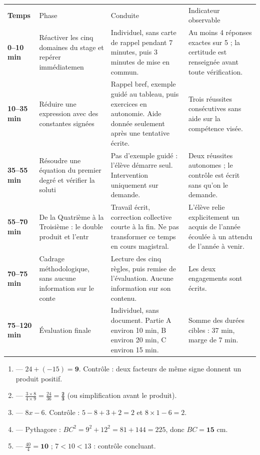 \documentclass[10pt,a4paper]{article}
\begin{document}
\par\noindent\begin{tabularx}{\linewidth}{>{\bfseries}p{18mm} p{34mm} X X}
\rowcolor{Navy}\color{white}Temps & \color{white}Phase & \color{white}Conduite & \color{white}Indicateur observable \\
0--10 min & Réactiver les cinq domaines du stage et repérer immédiatemen & Individuel, sans carte de rappel pendant 7 minutes, puis 3 minutes de mise en commun. & Au moins 4 réponses exactes sur 5 ; la certitude est renseignée avant toute vérification. \\
10--35 min & Réduire une expression avec des constantes signées & Rappel bref, exemple guidé au tableau, puis exercices en autonomie. Aide donnée seulement après une tentative écrite. & Trois réussites consécutives sans aide sur la compétence visée. \\
35--55 min & Résoudre une équation du premier degré et vérifier la soluti & Pas d'exemple guidé : l'élève démarre seul. Intervention uniquement sur demande. & Deux réussites autonomes ; le contrôle est écrit sans qu'on le demande. \\
55--70 min & De la Quatrième à la Troisième : le double produit et l'entr & Travail écrit, correction collective courte à la fin. Ne pas transformer ce temps en cours magistral. & L'élève relie explicitement un acquis de l'année écoulée à un attendu de l'année à venir. \\
70--75 min & Cadrage méthodologique, sans aucune information sur le conte & Lecture des cinq règles, puis remise de l'évaluation. Aucune information sur son contenu. & Les deux engagements sont écrits. \\
75--120 min & Évaluation finale & Individuel, sans document. Partie A environ 10 min, B environ 20 min, C environ 15 min. & Somme des durées cibles : 37 min, marge de 7 min. \\
\end{tabularx}
\newpage{}
\begin{enumerate}
\item {} --- $24 + (-15) = \mathbf{9}$. Contrôle : deux facteurs de même signe donnent un produit positif.
\item {} --- $\frac{3\times 8}{4\times 9}=\frac{24}{36}=\mathbf{\frac{2}{3}}$ (ou simplification avant le produit).
\item {} --- $8x-6$. Contrôle : $5-8+3+2=2$ et $8\times 1-6=2$.
\item {} --- Pythagore : $BC^2=9^2+12^2=81+144=225$, donc $BC=\mathbf{15}$ cm.
\item {} --- $\frac{40}{4}=\mathbf{10}$ ; $7 < 10 < 13$ : contrôle concluant.
\end{enumerate}
\end{document}
